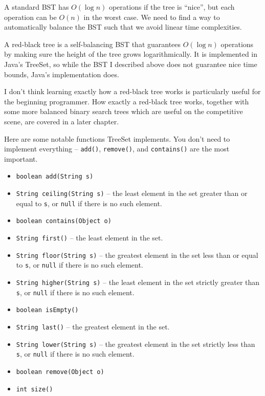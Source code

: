 \documentclass[11pt]{book}
\begin{document}
A standard BST has $O(\log{n})$ operations if the tree is ``nice'', but each operation can be $O(n)$ in the worst case. We need to find a way to automatically balance the BST such that we avoid linear time complexities.

A red-black tree is a self-balancing BST that guarantees $O(\log{n})$ operations by making sure the height of the tree grows logarithmically. It is implemented in Java's TreeSet, so while the BST I described above does not guarantee nice time bounds, Java's implementation does.

I don't think learning exactly how a red-black tree works is particularly useful for the beginning programmer. How exactly a red-black tree works, together with some more balanced binary search trees which are useful on the competitive scene, are covered in a later chapter.

Here are some notable functions TreeSet implements. You don't need to implement everything -- \texttt{add()}, \texttt{remove()}, and \texttt{contains()} are the most important.

\begin{itemize}

\item
\texttt{boolean add(String s)}

\item
\texttt{String ceiling(String s)} -- the least element in the set greater than or equal to \texttt{s}, or \texttt{null} if there is no such element.

\item
\texttt{boolean contains(Object o)}

\item
\texttt{String first()} -- the least element in the set.

\item
\texttt{String floor(String s)} -- the greatest element in the set less than or equal to \texttt{s}, or \texttt{null} if there is no such element.

\item
\texttt{String higher(String s)} -- the least element in the set strictly greater than \texttt{s}, or \texttt{null} if there is no such element.

\item
\texttt{boolean isEmpty()}

\item
\texttt{String last()} -- the greatest element in the set.

\item
\texttt{String lower(String s)} -- the greatest element in the set strictly less than \texttt{s}, or \texttt{null} if there is no such element.

\item
\texttt{boolean remove(Object o)}

\item
\texttt{int size()}

\end{itemize}
\end{document}
